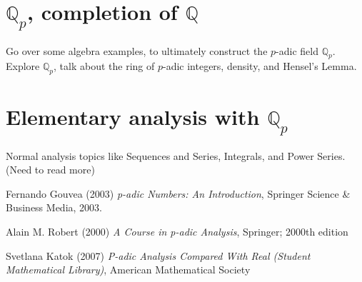 \documentclass[12pt]{article}
\newcommand{\qq}{\mathbb Q}   %
\begin{document}
\section{$\qq_p$, completion of $\qq$ }
Go over some algebra examples, to ultimately construct the $p$-adic field $\qq_p$. Explore $\qq_p$, talk about the ring of $p$-adic integers, density, and Hensel's Lemma. 

\section{Elementary analysis with $\qq_p$}
Normal analysis topics like Sequences and Series, Integrals, and Power Series. (Need to read more)
\newpage
\begin{thebibliography}{9}
    Fernando Gouvea (2003) \emph{p-adic Numbers: An Introduction}, Springer Science \& Business Media, 2003.
    
    Alain M. Robert (2000) \emph{A Course in p-adic Analysis}, Springer; 2000th edition

    Svetlana Katok (2007) \emph{P-adic Analysis Compared With Real (Student Mathematical Library)}, American Mathematical Society
    \end{thebibliography}
\end{document}
